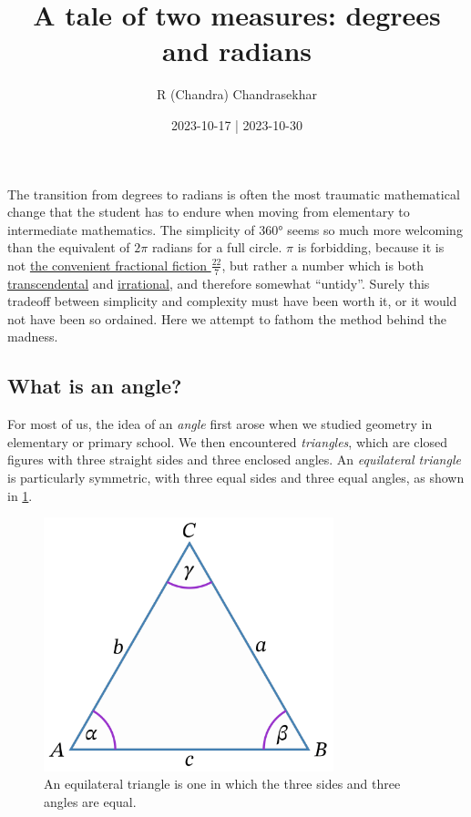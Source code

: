 \documentclass[
  a4paper,
]{article}
\title{A tale of two measures: degrees and radians}
\author{R (Chandra) Chandrasekhar}
\date{2023-10-17 | 2023-10-30}
\begin{document}
\maketitle

\thispagestyle{empty}


The transition from degrees to radians is often the most traumatic
mathematical change that the student has to endure when moving from
elementary to intermediate mathematics. The simplicity of 360° seems so
much more welcoming than the equivalent of \(2\pi\) radians for a full
circle. \(\pi\) is forbidding, because it is not
\href{https://en.wikipedia.org/wiki/Proof_that_22/7_exceeds_\%CF\%80}{the
convenient fractional fiction \(\frac{22}{7}\)}, but rather a number
which is both
\href{https://mathworld.wolfram.com/TranscendentalNumber.html}{transcendental}
and \href{https://en.wikipedia.org/wiki/Irrational_number}{irrational},
and therefore somewhat ``untidy''. Surely this tradeoff between
simplicity and complexity must have been worth it, or it would not have
been so ordained. Here we attempt to fathom the method behind the
madness.

\hypertarget{what-is-an-angle}{%
\subsection{What is an angle?}\label{what-is-an-angle}}

For most of us, the idea of an \emph{angle} first arose when we studied
geometry in elementary or primary school. We then encountered
\emph{triangles}, which are closed figures with three straight sides and
three enclosed angles. An \emph{equilateral triangle} is particularly
symmetric, with three equal sides and three equal angles, as shown in
\cref{fig:equilateral}.

\begin{figure}
\hypertarget{fig:equilateral}{%
\centering
\includegraphics[width=0.75\textwidth,height=\textheight]{images/equilateral.png}
\caption{An equilateral triangle is one in which the three sides and
three angles are equal.}\label{fig:equilateral}
}
\end{figure}
\end{document}
